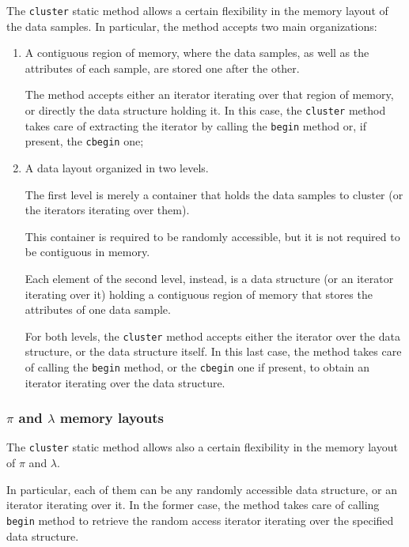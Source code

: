 \documentclass{article}
\begin{document}
The \texttt{cluster} static method allows a certain flexibility in the memory layout of the data
samples. In particular, the method accepts two main organizations:
\begin{enumerate}
\item A contiguous region of memory, where the data samples, as well as the attributes of each sample,
are stored one after the other.

The method accepts either an iterator iterating over that region of memory, or directly the data
structure holding it. In this case, the \texttt{cluster} method takes care of extracting the
iterator by calling the \texttt{begin} method or, if present, the \texttt{cbegin} one;

\item A data layout organized in two levels.

The first level is merely a container that holds the data samples to cluster (or the iterators
iterating over them).

This container is required to be randomly accessible, but it is not required to be contiguous in memory.

Each element of the second level, instead, is a data structure (or an iterator iterating over it) holding a
contiguous region of memory that stores the attributes of one data sample.

For both levels, the \texttt{cluster} method accepts either the iterator over the data structure, or
the data structure itself. In this last case, the method takes care of calling the
\texttt{begin} method, or the \texttt{cbegin} one if present, to obtain an iterator iterating
over the data structure.

\end{enumerate}

\hypertarget{par-pi-lambda-layout}{
\subsubsection{\texorpdfstring{\boldmath$\pi$ and \boldmath$\lambda$}{pi and lambda} memory layouts}
\label{par-pi-lambda-layout}}

The \texttt{cluster} static method allows also a certain flexibility in the memory layout
of $\pi$ and $\lambda$.

In particular, each of them can be any randomly accessible data structure, or an iterator
iterating over it.
In the former case, the method takes care of calling \texttt{begin} method to retrieve the
random access iterator iterating over the specified data structure.
\end{document}
